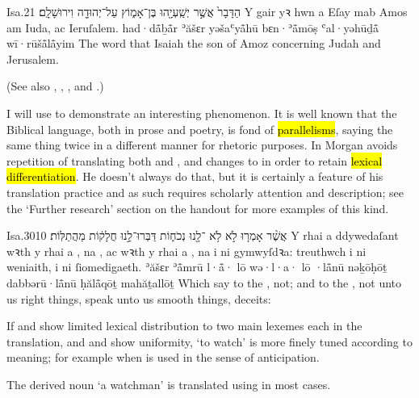 \begin{example}{Isa.}{2}{1}{}{}
	\quoling
	{הַדָּבָר֙ אֲשֶׁ֣ר 	יְשַֽׁעְיָ֖הוּ בֶּן־אָמ֑וֹץ עַל־יְהוּדָ֖ה וִירוּשָׁלִָֽם׃}
	{Y gair yꝛ hwn a  Eſay mab Amos am Iuda, ac Ieruſalem.}
	{had·då̄ḇå̄r ʾăšɛr  yəšaʿyå̄hū bɛn·ʾå̄mōṣ ʿal·yəhūḏå̄ wī·rūšå̄lå̄yim}
	{The word that Isaiah the son of Amoz  concerning Judah and Jerusalem.}
\end{example}
(See also , , ,  and .)

\begin{paper}
	I will use  to demonstrate an interesting phenomenon. It is well known that the Biblical language, both in prose and poetry, is fond of \hl{parallelisms}, saying the same thing twice in a different manner for rhetoric purposes. In  Morgan avoids repetition of  translating both  and , and changes   to  in order to retain \hl{lexical differentiation}. He doesn’t always do that, but it is certainly a feature of his translation practice and as such requires scholarly attention and description; see the ‘Further research’ section on the handout for more examples of this kind.
\end{paper}

\begin{example}{Isa.}{30}{10}{}{}
	\quoling
	{אֲשֶׁ֨ר אָמְר֤וּ  לֹ֣א   לֹ֥א ־לָ֖נוּ נְכֹח֑וֹת דַּבְּרוּ־לָ֣נוּ חֲלָק֔וֹת  מַהֲתַלּֽוֹת׃}
	{Y rhai a ddywedaſant wꝛth y rhai a , na , ac wꝛth y rhai a , na  i ni gymwyſdꝛa: treuthwch i ni weniaith,  i ni ſiomedigaeth.}
	{ʾăšɛr ʾå̄mrū l·å̄· lō  wə·l·a· lō ·lå̄nū nəḵōḥōṯ dabbərū·lå̄nū ḥălå̄qōṯ  mahăṯallōṯ}
	{Which say to the ,  not; and to the ,  not unto us right things, speak unto us smooth things,  deceits:}
\end{example}




\begin{paper}
	{\click} If  and  show limited lexical distribution to two main lexemes each in the translation, and  and show uniformity,  ‘to watch’ is more finely tuned according to meaning; for example  when  is used in the sense of anticipation. 

	The derived noun  ‘a watchman’ is translated using  in most cases.
\end{paper}

